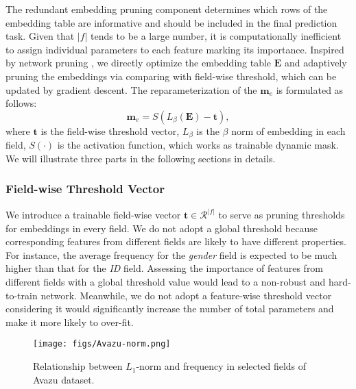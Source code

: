 \documentclass[sigconf]{acmart}
\begin{document}
The redundant embedding pruning component determines which rows of the embedding table are informative and should be included in the final prediction task. Given that $|f|$ tends to be a large number, it is computationally inefficient to assign individual parameters to each feature marking its importance. Inspired by network pruning \cite{DST,Cont_Spar}, we directly optimize the embedding table $\mathbf{E}$ and adaptively pruning the embeddings via comparing with field-wise threshold, which can be updated by gradient descent. The reparameterization of the $\mathbf{m}_e$ is formulated as follows:
\begin{equation}
\label{eq:mask_f}
    \mathbf{m}_e = S(L_{\beta}(\mathbf{E})-\mathbf{t}),
\end{equation}
where $\mathbf{t}$ is the field-wise threshold vector, $L_{\beta}$ is the $\beta$ norm of embedding in each field, $S(\cdot)$ is the activation function, which works as trainable dynamic mask. We will illustrate three parts in the following sections in details.

\subsubsection{Field-wise Threshold Vector}
We introduce a trainable field-wise vector $\mathbf{t} \in \mathcal{R}^{|f|}$ to serve as pruning thresholds for embeddings in every field. We do not adopt a global threshold because corresponding features from different fields are likely to have different properties. For instance, the average frequency for the \textit{gender} field is expected to be much higher than that for the \textit{ID} field. Assessing the importance of features from different fields with a global threshold value would lead to a non-robust and hard-to-train network. Meanwhile, we do not adopt a feature-wise threshold vector considering it would significantly increase the number of total parameters and make it more likely to over-fit.

\begin{figure}[!htbp]
    \centering
    \texttt{[image: figs/Avazu-norm.png]}
    \vspace{-5pt}
    \caption{Relationship between $L_1$-norm and frequency in selected fields of Avazu dataset.}
    \vspace{-10pt}
    \label{fig:field}
\end{figure}
\end{document}
